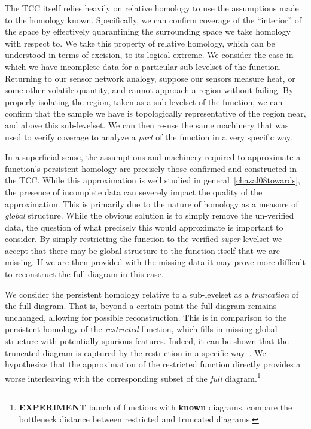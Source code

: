 The TCC itself relies heavily on relative homology to use the assumptions made to the homology known.
Specifically, we can confirm coverage of the ``interior'' of the space by effectively quarantining the surrounding space we take homology with respect to.
We take this property of relative homology, which can be understood in terms of excision, to its logical extreme.
We consider the case in which we have incomplete data for a particular sub-levelset of the function.
Returning to our sensor network analogy, suppose our sensors measure heat, or some other volatile quantity, and cannot approach a region without failing.
By properly isolating the region, taken as a sub-levelset of the function, we can confirm that the sample we have is topologically representative of the region near, and above this sub-levelset.
We can then re-use the same machinery that was used to verify coverage to analyze a \emph{part} of the function in a very specific way.

In a superficial sense, the assumptions and machinery required to approximate a function's persistent homology are precisely those confirmed and constructed in the TCC. %
While this approximation is well studied in general~\ref{chazal08towards}, the presence of incomplete data can severely impact the quality of the approximation.
This is primarily due to the nature of homology as a measure of \emph{global} structure.
While the obvious solution is to simply remove the un-verified data, the question of what precisely this would approximate is important to consider.
By simply restricting the function to the verified \emph{super}-levelset we accept that there may be global structure to the function itself that we are missing.
If we are then provided with the missing data it may prove more difficult to reconstruct the full diagram in this case.

We consider the persistent homology relative to a sub-levelset as a \emph{truncation} of the full diagram.
That is, beyond a certain point the full diagram remains unchanged, allowing for possible reconstruction.
This is in comparison to the persistent homology of the \emph{restricted} function, which fills in missing global structure with potentially spurious features.
Indeed, it can be shown that the truncated diagram is captured by the restriction in a specific way~\cite{extendedpersistence}.
We hypothesize that the approximation of the restricted function directly provides a worse interleaving with the corresponding subset of the \emph{full} diagram.\footnote{\textbf{EXPERIMENT} bunch of functions with \textbf{known} diagrams. compare the bottleneck distance between restricted and truncated diagrams.}

